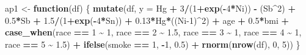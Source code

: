\documentclass[12pt, twoside]{amherstthesis}
\newenvironment{Shaded}{\begin{snugshade}}{\end{snugshade}}
\newcommand{\AttributeTok}[1]{\textcolor[rgb]{0.13,0.29,0.53}{#1}}
\newcommand{\ControlFlowTok}[1]{\textcolor[rgb]{0.13,0.29,0.53}{\textbf{#1}}}
\newcommand{\DecValTok}[1]{\textcolor[rgb]{0.00,0.00,0.81}{#1}}
\newcommand{\FloatTok}[1]{\textcolor[rgb]{0.00,0.00,0.81}{#1}}
\newcommand{\FunctionTok}[1]{\textcolor[rgb]{0.13,0.29,0.53}{\textbf{#1}}}
\newcommand{\NormalTok}[1]{#1}
\newcommand{\OtherTok}[1]{\textcolor[rgb]{0.56,0.35,0.01}{#1}}
\newcommand{\SpecialCharTok}[1]{\textcolor[rgb]{0.81,0.36,0.00}{\textbf{#1}}}
\begin{document}
\begin{Shaded}
\begin{Highlighting}[]
\NormalTok{ap1 }\OtherTok{\textless{}{-}} \ControlFlowTok{function}\NormalTok{(df) \{}
  \FunctionTok{mutate}\NormalTok{(df, }\AttributeTok{y =} 
\NormalTok{           Hg }\SpecialCharTok{+} \DecValTok{3}\SpecialCharTok{/}\NormalTok{(}\DecValTok{1}\SpecialCharTok{+}\FunctionTok{exp}\NormalTok{(}\SpecialCharTok{{-}}\DecValTok{4}\SpecialCharTok{*}\NormalTok{Ni)) }\SpecialCharTok{{-}}\NormalTok{ (Sb}\SpecialCharTok{\^{}}\DecValTok{2}\NormalTok{) }\SpecialCharTok{+} \FloatTok{0.5}\SpecialCharTok{*}\NormalTok{Sb }\SpecialCharTok{+} \FloatTok{1.5}\SpecialCharTok{/}\NormalTok{(}\DecValTok{1}\SpecialCharTok{+}\FunctionTok{exp}\NormalTok{(}\SpecialCharTok{{-}}\DecValTok{4}\SpecialCharTok{*}\NormalTok{Sn)) }\SpecialCharTok{+} 
           \FloatTok{0.13}\SpecialCharTok{*}\NormalTok{Hg}\SpecialCharTok{*}\NormalTok{((Ni}\DecValTok{{-}1}\NormalTok{)}\SpecialCharTok{\^{}}\DecValTok{2}\NormalTok{) }\SpecialCharTok{+}
\NormalTok{           age }\SpecialCharTok{+} \FloatTok{0.5}\SpecialCharTok{*}\NormalTok{bmi }\SpecialCharTok{+} 
           \FunctionTok{case\_when}\NormalTok{(race }\SpecialCharTok{==} \DecValTok{1} \SpecialCharTok{\textasciitilde{}} \DecValTok{1}\NormalTok{, }
\NormalTok{                     race }\SpecialCharTok{==} \DecValTok{2} \SpecialCharTok{\textasciitilde{}} \FloatTok{1.5}\NormalTok{, }
\NormalTok{                     race }\SpecialCharTok{==} \DecValTok{3} \SpecialCharTok{\textasciitilde{}} \DecValTok{1}\NormalTok{, }
\NormalTok{                     race }\SpecialCharTok{==} \DecValTok{4} \SpecialCharTok{\textasciitilde{}} \DecValTok{1}\NormalTok{, }
\NormalTok{                     race }\SpecialCharTok{==} \DecValTok{5} \SpecialCharTok{\textasciitilde{}} \FloatTok{1.5}\NormalTok{) }\SpecialCharTok{+}
           \FunctionTok{ifelse}\NormalTok{(smoke }\SpecialCharTok{==} \DecValTok{1}\NormalTok{, }\SpecialCharTok{{-}}\DecValTok{1}\NormalTok{, }\FloatTok{0.5}\NormalTok{) }\SpecialCharTok{+}
           \FunctionTok{rnorm}\NormalTok{(}\FunctionTok{nrow}\NormalTok{(df), }\DecValTok{0}\NormalTok{, }\DecValTok{5}\NormalTok{))}
\NormalTok{\}}


\end{Highlighting}
\end{Shaded}
\end{document}
